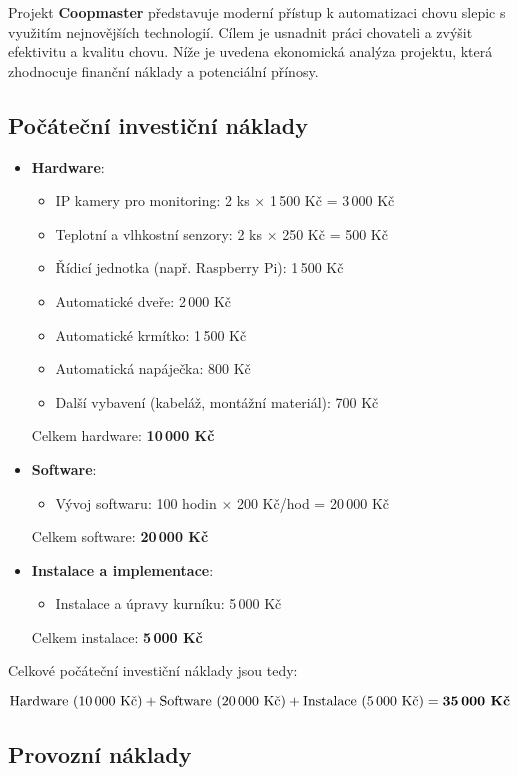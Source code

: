 
Projekt \textbf{Coopmaster} představuje moderní přístup k automatizaci chovu slepic s využitím nejnovějších technologií.
Cílem je usnadnit práci chovateli a zvýšit efektivitu a kvalitu chovu.
Níže je uvedena ekonomická analýza projektu, která zhodnocuje finanční náklady a potenciální přínosy.

\subsection*{Počáteční investiční náklady}

\begin{itemize}
    \item \textbf{Hardware}:
    \begin{itemize}
        \item IP kamery pro monitoring: 2 ks × 1\,500 Kč = 3\,000 Kč
        \item Teplotní a vlhkostní senzory: 2 ks × 250 Kč = 500 Kč
        \item Řídicí jednotka (např. Raspberry Pi): 1\,500 Kč
        \item Automatické dveře: 2\,000 Kč
        \item Automatické krmítko: 1\,500 Kč
        \item Automatická napáječka: 800 Kč
        \item Další vybavení (kabeláž, montážní materiál): 700 Kč
    \end{itemize}
    Celkem hardware: \textbf{10\,000 Kč}
    \item \textbf{Software}:
    \begin{itemize}
        \item Vývoj softwaru: 100 hodin × 200 Kč/hod = 20\,000 Kč
    \end{itemize}
    Celkem software: \textbf{20\,000 Kč}
    \item \textbf{Instalace a implementace}:
    \begin{itemize}
        \item Instalace a úpravy kurníku: 5\,000 Kč
    \end{itemize}
    Celkem instalace: \textbf{5\,000 Kč}
\end{itemize}

Celkové počáteční investiční náklady jsou tedy:

\[
\text{Hardware (10\,000 Kč)} + \text{Software (20\,000 Kč)} + \text{Instalace (5\,000 Kč)} = \textbf{35\,000 Kč}
\]

\subsection*{Provozní náklady}

